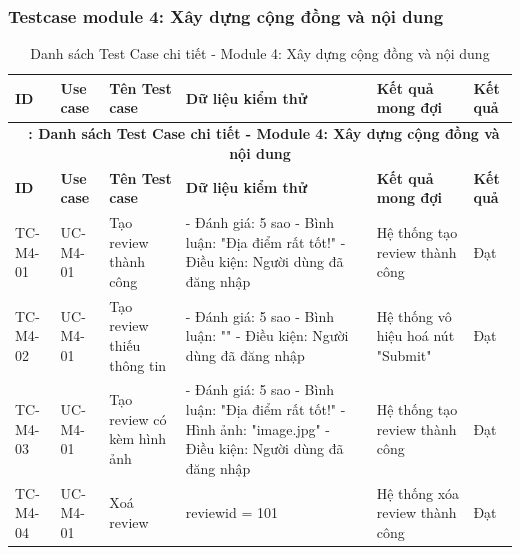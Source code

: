 \subsubsection{Testcase module 4: Xây dựng cộng đồng và nội dung}

\hypertarget{target:tc_m4}{}
\begin{landscape}
\small 
\begin{longtable}{|p{2.2cm}|p{2.2cm}|p{4cm}|p{4.5cm}|p{6cm}|p{2cm}|}
    
\caption{Danh sách Test Case chi tiết - Module 4: Xây dựng cộng đồng và nội dung} \label{tab:tc_module4} \\
\hline
\textbf{ID} & \textbf{ Use case} & \textbf{Tên Test case} & \textbf{Dữ liệu kiểm thử} & \textbf{Kết quả mong đợi} & \textbf{Kết quả } \\
\hline
\endfirsthead

\multicolumn{6}{c}{{\bfseries \tablename\ \thetable{}: Danh sách Test Case chi tiết - Module 4: Xây dựng cộng đồng và nội dung}} \\
\hline
\textbf{ID} & \textbf{ Use case} & \textbf{Tên Test case} & \textbf{Dữ liệu kiểm thử} & \textbf{Kết quả mong đợi} & \textbf{Kết quả } \\
\hline
\endhead

\hline
\endlastfoot


TC-M4-01 & UC-M4-01 & Tạo review thành công & 
- Đánh giá: 5 sao \newline 
- Bình luận: "Địa điểm rất tốt!"
- Điều kiện: Người dùng đã đăng nhập & 
Hệ thống tạo review thành công & Đạt\\
\hline

TC-M4-02 & UC-M4-01 & Tạo review thiếu thông tin & 
- Đánh giá: 5 sao \newline 
- Bình luận: ""
- Điều kiện: Người dùng đã đăng nhập & 
Hệ thống vô hiệu hoá nút "Submit" & Đạt \\
\hline

TC-M4-03 & UC-M4-01 & Tạo review có kèm hình ảnh & 
- Đánh giá: 5 sao \newline 
- Bình luận: "Địa điểm rất tốt!"
- Hình ảnh: "image.jpg"
- Điều kiện: Người dùng đã đăng nhập & 
Hệ thống tạo review thành công & Đạt\\
\hline

TC-M4-04 & UC-M4-01 & Xoá review & 
reviewid = 101 & 
Hệ thống xóa review thành công & Đạt \\
\hline


\end{longtable}
\end{landscape}
